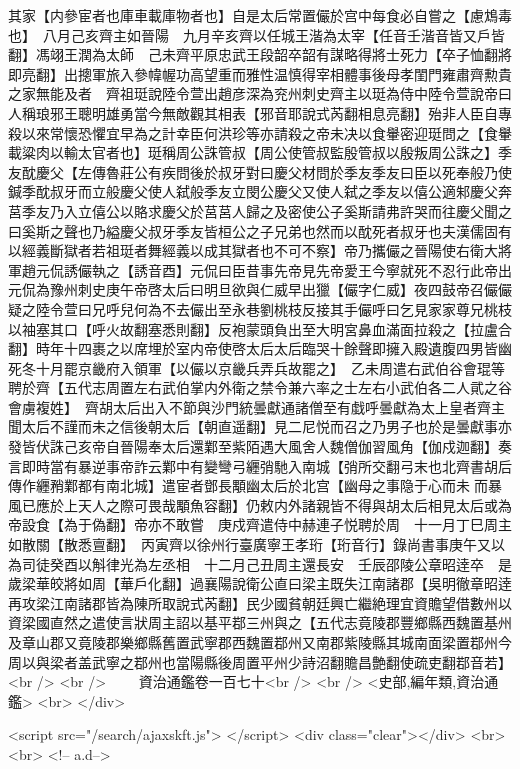 其家【内參宦者也庫車載庫物者也】自是太后常置儼於宫中每食必自嘗之【慮鴆毒也】　八月己亥齊主如晉陽　九月辛亥齊以任城王湝為太宰【任音壬湝音皆又戶皆翻】馮翊王潤為太師　己未齊平原忠武王段韶卒韶有謀略得將士死力【卒子恤翻將即亮翻】出摠軍旅入參幃幄功高望重而雅性温慎得宰相體事後母孝閨門雍肅齊勲貴之家無能及者　齊祖珽說陸令萱出趙彦深為兖州刺史齊主以珽為侍中陸令萱說帝曰人稱琅邪王聰明雄勇當今無敵觀其相表【邪音耶說式芮翻相息亮翻】殆非人臣自專殺以來常懷恐懼宜早為之計幸臣何洪珍等亦請殺之帝未决以食轝密迎珽問之【食轝載粱肉以輸太官者也】珽稱周公誅管叔【周公使管叔監殷管叔以殷叛周公誅之】季友酖慶父【左傳魯莊公有疾問後於叔牙對曰慶父材問於季友季友曰臣以死奉般乃使鍼季酖叔牙而立般慶父使人弑般季友立閔公慶父又使人弑之季友以僖公適邾慶父奔莒季友乃入立僖公以賂求慶父於莒莒人歸之及密使公子奚斯請弗許哭而往慶父聞之曰奚斯之聲也乃縊慶父叔牙季友皆桓公之子兄弟也然而以酖死者叔牙也夫漢儒固有以經義斷獄者若祖珽者舞經義以成其獄者也不可不察】帝乃攜儼之晉陽使右衛大將軍趙元侃誘儼執之【誘音酉】元侃曰臣昔事先帝見先帝愛王今寧就死不忍行此帝出元侃為豫州刺史庚午帝啓太后曰明旦欲與仁威早出獵【儼字仁威】夜四鼓帝召儼儼疑之陸令萱曰兄呼兒何為不去儼出至永巷劉桃枝反接其手儼呼曰乞見家家尊兄桃枝以袖塞其口【呼火故翻塞悉則翻】反袍蒙頭負出至大明宮鼻血滿面拉殺之【拉盧合翻】時年十四裹之以席埋於室内帝使啓太后太后臨哭十餘聲即擁入殿遺腹四男皆幽死冬十月罷京畿府入領軍【以儼以京畿兵弄兵故罷之】　乙未周遣右武伯谷會琨等聘於齊【五代志周置左右武伯掌内外衛之禁令兼六率之士左右小武伯各二人貮之谷會虜複姓】　齊胡太后出入不節與沙門統曇獻通諸僧至有戱呼曇獻為太上皇者齊主聞太后不謹而未之信後朝太后【朝直遥翻】見二尼悦而召之乃男子也於是曇獻事亦發皆伏誅己亥帝自晉陽奉太后還鄴至紫陌遇大風舍人魏僧伽習風角【伽戍迦翻】奏言即時當有暴逆事帝詐云鄴中有變彎弓纒弰馳入南城【弰所交翻弓末也北齊書胡后傳作纒矟鄴都有南北城】遣宦者鄧長顒幽太后於北宫【幽母之事隐于心而未而暴風已應於上天人之際可畏哉顒魚容翻】仍敕内外諸親皆不得與胡太后相見太后或為帝設食【為于偽翻】帝亦不敢嘗　庚戍齊遣侍中赫連子悦聘於周　十一月丁巳周主如散關【散悉亶翻】　丙寅齊以徐州行臺廣寧王孝珩【珩音行】錄尚書事庚午又以為司徒癸酉以斛律光為左丞相　十二月己丑周主還長安　壬辰邵陵公章昭逹卒　是歲梁華皎將如周【華戶化翻】過襄陽說衛公直曰梁主既失江南諸郡【吳明徹章昭逹再攻梁江南諸郡皆為陳所取說式芮翻】民少國貧朝廷興亡繼絶理宜資贍望借數州以資梁國直然之遣使言狀周主詔以基平鄀三州與之【五代志竟陵郡豐鄉縣西魏置基州及章山郡又竟陵郡樂鄉縣舊置武寧郡西魏置鄀州又南郡紫陵縣其城南面梁置鄀州今周以與梁者盖武寧之鄀州也當陽縣後周置平州少詩沼翻贍昌艶翻使疏吏翻鄀音若】<br />
<br />
　　資治通鑑卷一百七十<br />
<br />
<史部,編年類,資治通鑑>  <br>
   </div> 

<script src="/search/ajaxskft.js"> </script>
 <div class="clear"></div>
<br>
<br>
 <!-- a.d-->

